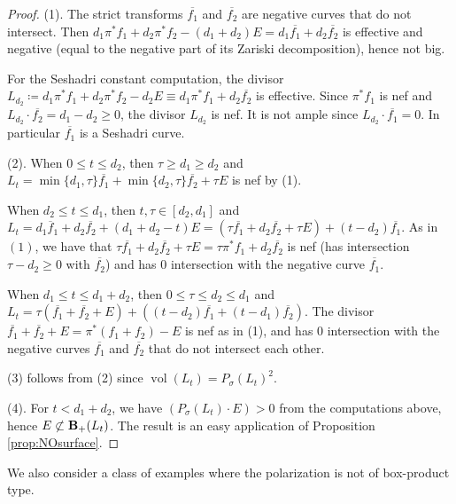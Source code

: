 \documentclass[12pt]{amsart}
\theoremstyle{definition}
\renewcommand{\geq}{\geqslant}
\renewcommand{\leq}{\leqslant}
\DeclareMathOperator{\vol}{vol}
\newcommand{\?}{ \circled{{\large\bf ?}}}
\begin{document}
\begin{proof}
	(1). The strict transforms $\overline{f_1}$ and $\overline{f_2}$ are negative curves that do not intersect. Then $d_1\pi^*f_1+{d_2}\pi^*f_2-(d_1+{d_2})E=d_1\overline{f_1}+{d_2}\overline{f_2}$ is effective and negative (equal to the negative part of its Zariski decomposition), hence not big.
	
For the Seshadri constant computation, the divisor
	$L_{d_2}\coloneqq d_1\pi^*f_1+{d_2}\pi^*f_2-d_2E\equiv {d_1}\pi^*f_1+d_2\overline{f_2}$ is effective. Since $\pi^*f_1$ is nef and $L_{d_2}\cdot\overline{f_2}={d_1}-d_2\geq 0$, the divisor $L_{d_2}$ is nef. It is not ample since $L_{d_2}\cdot\overline{f_1}=0$. In particular $\overline{f_1}$ is a Seshadri curve.
	
(2). When $0\leq t\leq d_2$, then $\tau\geq d_1\geq d_2$ and $L_t=\min\{d_1,\tau\}\overline{f_1}+\min\{d_2,\tau\}\overline{f_2}+\tau E$ is nef by (1).	

When $d_2\leq t\leq {d_1}$, then $t,\tau\in[d_2,d_1]$ and
$L_t=d_1\overline f_1+{d_2}\overline{f_2}+(d_1+{d_2}-t)E=(\tau\overline {f_1}+d_2\overline{f_2}+\tau E)+(t-d_2)\overline {f_1}$. 
	As in $(1)$, we have that $\tau\overline {f_1}+d_2\overline{f_2}+\tau E=\tau\pi^*f_1+d_2\overline{f_2}$ is nef (has intersection $\tau-d_2\geq 0$ with $\overline{f_2}$) and has 0 intersection with the negative curve $\overline {f_1}$.
	
	When ${d_1}\leq t\leq d_1+{d_2}$, then $0\leq\tau\leq d_2\leq d_1$ and $L_t=\tau(\overline {f_1}+\overline{f_2}+E)+((t-{d_2})\overline{f_1}+(t-d_1)\overline{f_2})$. The divisor $\overline{f_1}+\overline{f_2}+E=\pi^*(f_1+f_2)-E$ is nef as in (1), and has 0 intersection with the negative curves $\overline{f_1}$ and $\overline{f_2}$ that do not intersect each other.
	
	(3) follows from (2) since $\vol(L_t)=P_{\sigma}(L_t)^2$. 
	
	(4). For $t<d_1+d_2$, we have $(P_{\sigma}(L_t)\cdot E)>0$ from the computations above, hence $E\not\subset{\bf B}_+(L_t)$. The result is an easy application of Proposition \ref{prop:NOsurface}.
\end{proof}

We also consider a class of examples where the polarization is not of box-product type.
\end{document}
